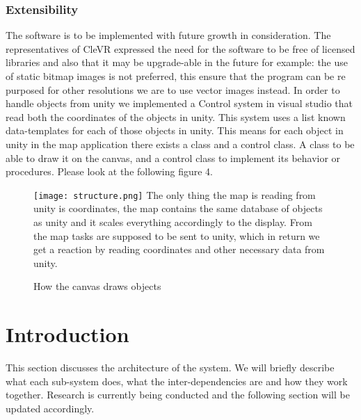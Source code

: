 \documentclass[11pt]{article}
\begin{document}
        \subsubsection{Extensibility}
        The software is to be implemented with future growth in consideration. The representatives of CleVR expressed the need for the software to be free of licensed libraries and also that it may be upgrade-able in the future for example: the use of static bitmap images is not preferred, this ensure that the program can be re purposed for other resolutions we are to use vector images instead. 
        In order to handle objects from unity we implemented a Control system in visual studio that read both the coordinates of the objects in unity. This system uses a list known data-templates for each of those objects in unity. 
        This means for each object in unity in the map application there exists a class and a control class. A class to be able to draw it on the canvas, and a control class to implement its behavior or procedures. Please look at the following figure 4.
        \begin{figure}[H]
	\caption{How the canvas draws objects}
	\texttt{[image: structure.png]}
    The only thing the map is reading from unity is coordinates, the map contains the same database of objects as unity and it scales everything accordingly to the display. From the map tasks are supposed to be sent to unity, which in return we get a reaction by reading coordinates and other necessary data from unity.
\end{figure}
        


\section{Introduction}
This section discusses the architecture of the system. We will briefly describe what each sub-system does, what the inter-dependencies are and how they work together. Research is currently being conducted and the following section will be updated accordingly.

\end{document}
